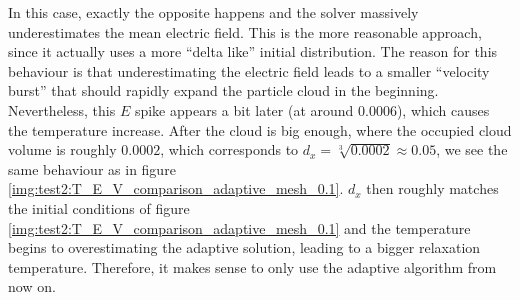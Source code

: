 In this case, exactly the opposite happens and the solver massively underestimates the mean electric field. This is the more reasonable approach, since it actually uses a more ``delta like'' initial distribution. The reason for this behaviour is that underestimating the electric field leads to a smaller ``velocity burst'' that should rapidly expand the particle cloud in the beginning. Nevertheless, this $E$ spike appears a bit later (at around $0.0006$), which causes the temperature increase. After the cloud is big enough, where the occupied cloud volume is roughly $0.0002$, which corresponds to $d_x = \sqrt[3]{0.0002} \approx 0.05$, we see the same behaviour as in figure \ref{img:test2:T_E_V_comparison_adaptive_mesh_0.1}. $d_x$ then roughly matches the initial conditions of figure \ref{img:test2:T_E_V_comparison_adaptive_mesh_0.1} and the temperature begins to overestimating the adaptive solution, leading to a bigger relaxation temperature. Therefore, it makes sense to only use the adaptive algorithm from now on.


